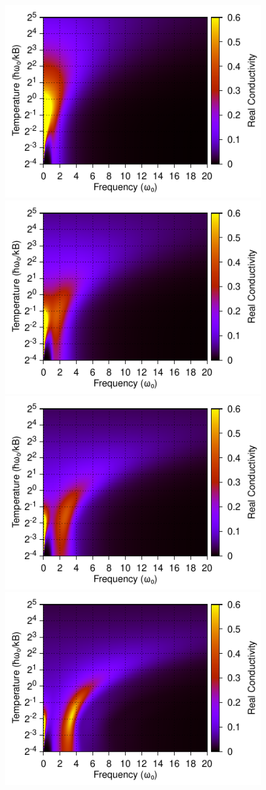 \begin{figure}[t]
    \centering
    \includegraphics[width=.49\textwidth]{figures/frohlich-3d-real-conductivity-alpha-1-temp-00625to32-freq-0to30-contourf-COLOUR.pdf}
    \includegraphics[width=.49\textwidth]{figures/frohlich-3d-real-conductivity-alpha-2-temp-00625to32-freq-0to30-contourf-COLOUR.pdf}
    \includegraphics[width=.49\textwidth]{figures/frohlich-3d-real-conductivity-alpha-3-temp-00625to32-freq-0to30-contourf-COLOUR.pdf}
    \includegraphics[width=.49\textwidth]{figures/frohlich-3d-real-conductivity-alpha-4-temp-00625to32-freq-0to30-contourf-COLOUR.pdf}

\end{figure}
